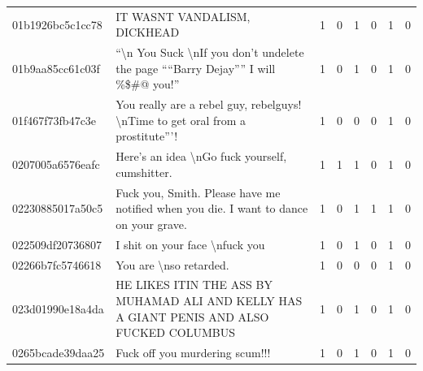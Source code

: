\begin{table}[htb]
{\begin{minipage}{\textheight}
\begin{threeparttable}
\begin{tabularx}{\textwidth}{L{0.8} L{6.6} C{0.1} C{0.1} C{0.1} C{0.1} C{0.1} C{0.1}}
                    01b1926bc5c1cc78 & IT WASNT VANDALISM, DICKHEAD                                                                                                     & 1           & 0           & 1           & 0           & 1           & 0           \\
                    01b9aa85cc61c03f & ``\textbackslash n You Suck \textbackslash nIf you don't undelete the page ````Barry Dejay'''' I will \%\$\#@ you!''             & 1           & 0           & 1           & 0           & 1           & 0           \\
                    01f467f73fb47c3e & You really are a rebel guy, rebelguys! \textbackslash nTime to get oral from a prostitute'''!                                    & 1           & 0           & 0           & 0           & 1           & 0           \\
                    0207005a6576eafc & Here's an idea \textbackslash nGo fuck yourself, cumshitter.                                                                     & 1           & 1           & 1           & 0           & 1           & 0           \\
                    02230885017a50c5 & Fuck you, Smith. Please have me notified when you die. I want to dance on your grave.                                            & 1           & 0           & 1           & 1           & 1           & 0           \\
                    022509df20736807 & I shit on your face \textbackslash nfuck you                                                                                     & 1           & 0           & 1           & 0           & 1           & 0           \\
                    02266b7fc5746618 & You are \textbackslash nso retarded.                                                                                             & 1           & 0           & 0           & 0           & 1           & 0           \\
                    023d01990e18a4da & HE LIKES ITIN THE ASS BY MUHAMAD ALI AND KELLY HAS A GIANT PENIS AND ALSO FUCKED COLUMBUS                                        & 1           & 0           & 1           & 0           & 1           & 0           \\
                    0265bcade39daa25 & Fuck off you murdering scum!!!                                                                                                   & 1           & 0           & 1           & 0           & 1           & 0           \\

\end{tabularx}
\end{threeparttable}
\end{minipage}}
\end{table}
